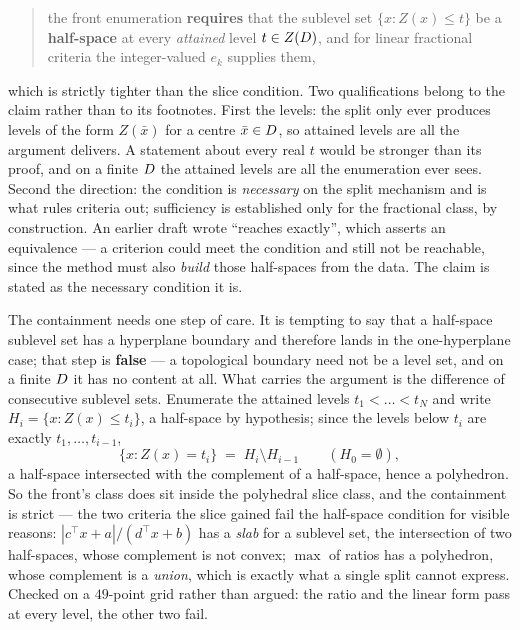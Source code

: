 \documentclass[11pt,a4paper]{article}
\begin{document}
\begin{quote}
the front enumeration \textbf{requires} that the sublevel set
$\{x : Z(x) \leqslant t\}$ be a \textbf{half-space} at every \emph{attained}
level $t \in Z(D)$, and for linear fractional criteria the integer-valued
$e_k$ supplies them,
\end{quote}

\noindent
which is strictly tighter than the slice condition.  Two qualifications belong
to the claim rather than to its footnotes.  First the levels: the split only
ever produces levels of the form $Z(\bar x)$ for a centre $\bar x \in D$,
so attained levels are all the argument delivers.  A statement about every real
$t$ would be stronger than its proof, and on a finite $D$ the attained
levels are all the enumeration ever sees.  Second the direction: the condition
is \emph{necessary} on the split mechanism and is what rules criteria out;
sufficiency is established only for the fractional class, by construction.  An
earlier draft wrote ``reaches exactly'', which asserts an equivalence --- a
criterion could meet the condition and still not be reachable, since the method
must also \emph{build} those half-spaces from the data.  The claim is stated as
the necessary condition it is.

The containment needs one step of care.  It is tempting to say that a
half-space sublevel set has a hyperplane boundary and therefore lands in the
one-hyperplane case; that step is \textbf{false} --- a topological boundary
need not be a level set, and on a finite $D$ it has no content at all.
What carries the argument is the difference of consecutive sublevel sets.
Enumerate the attained levels $t_1 < \dots < t_N$ and write
$H_i = \{x : Z(x) \leqslant t_i\}$, a half-space by hypothesis; since the
levels below $t_i$ are exactly $t_1,\dots,t_{i-1}$,
\[
  \{x : Z(x) = t_i\} \;=\; H_i \setminus H_{i-1} \qquad (H_0 = \emptyset) ,
\]
a half-space intersected with the complement of a half-space, hence a
polyhedron.  So the front's class does sit inside the polyhedral slice class,
and the containment is strict --- the two criteria the slice gained fail the
half-space condition for visible reasons: $|c^{\top}x + a|/(d^{\top}x + b)$ has
a \emph{slab} for a sublevel set, the intersection of two half-spaces, whose
complement is not convex; $\max$ of ratios has a polyhedron, whose complement
is a \emph{union}, which is exactly what a single split cannot express.  Checked on a $49$-point
grid rather than argued: the ratio and the linear form pass at every level, the
other two fail.
\end{document}
